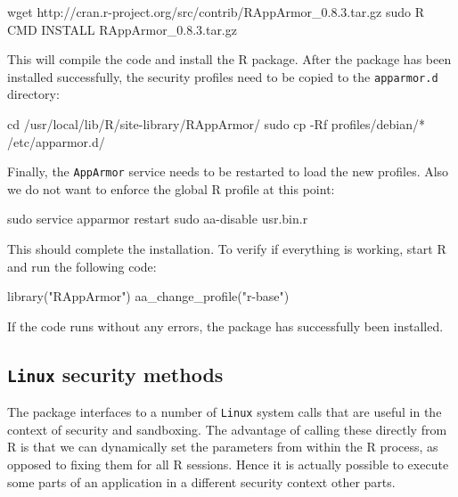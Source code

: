 \documentclass{jss}
\newcommand{\R}{\textsf{R}\xspace}
\newcommand{\AppArmor}{\texttt{AppArmor}\xspace}
\newcommand{\RAppArmor}{\pkg{RAppArmor}\xspace}
\newcommand{\Linux}{\texttt{Linux}\xspace}
\begin{document}
\begin{CodeChunk}
\begin{CodeInput}
wget http://cran.r-project.org/src/contrib/RAppArmor_0.8.3.tar.gz
sudo R CMD INSTALL RAppArmor_0.8.3.tar.gz
\end{CodeInput}
\end{CodeChunk}

This will compile the  code and install the \R package. After the
package has been installed successfully, the security profiles need to be
copied to the \texttt{apparmor.d} directory:

\begin{CodeChunk}
\begin{CodeInput}
cd /usr/local/lib/R/site-library/RAppArmor/
sudo cp -Rf profiles/debian/* /etc/apparmor.d/
\end{CodeInput}
\end{CodeChunk}

Finally, the \AppArmor service needs to be restarted to load the new profiles.
Also we do not want to enforce the global \R profile at this point:

\begin{CodeChunk}
\begin{CodeInput}
sudo service apparmor restart
sudo aa-disable usr.bin.r
\end{CodeInput}
\end{CodeChunk}

This should complete the installation. To verify if everything is working, start
\R and run the following code:

\begin{CodeChunk}
\begin{CodeInput}
library("RAppArmor")
aa_change_profile("r-base")
\end{CodeInput}
\end{CodeChunk}

If the code runs without any errors, the package has successfully been
installed. 

\subsection[Linux security methods]{\Linux security methods}

The \RAppArmor package interfaces to a number of \Linux system calls that are
useful in the context of security and sandboxing. The advantage of calling
these directly from \R is that we can dynamically set the parameters from
within the \R process, as opposed to fixing them for all \R sessions. Hence it
is actually possible to execute some parts of an application in a different
security context other parts.
\end{document}
